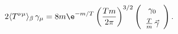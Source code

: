 \begin{equation}
\label{eq:t_low}
 2\langle T^{\nu\mu}\rangle_\beta\,\gamma_\mu=8m\e^{-m/T}
\left(\frac{Tm}{2\pi}\right)^{3/2}\left(\begin{array}{c}\gamma_0\\[1.5mm]
 \tfrac{T}{m}\,\vec\gamma\end{array} \right).
\end{equation}

